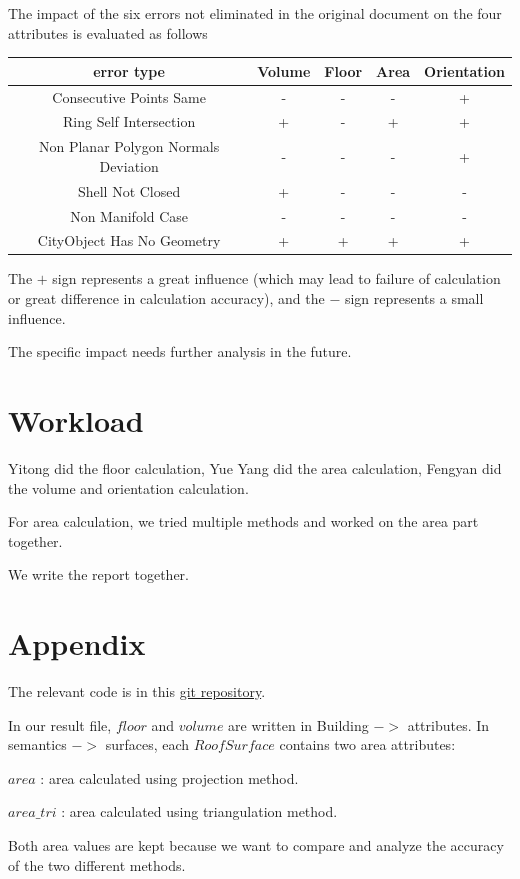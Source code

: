 \documentclass[12pt]{article}
\begin{document}
The impact of the six errors not eliminated in the original document on the four attributes is evaluated as follows

\begin{center}
\begin{tabular}{ |c|c|c|c|c| } 
 \hline
 error type & Volume & Floor & Area & Orientation \\ 
 \hline
 Consecutive Points Same & - & - & - & + \\ 
 \hline
 Ring Self Intersection & + & - & + & + \\ 
 \hline
 Non Planar Polygon Normals Deviation & - & - & - & + \\ 
 \hline
 Shell Not Closed & + & - & - & - \\ 
 \hline
 Non Manifold Case & - & - & - & - \\ 
 \hline
 CityObject Has No Geometry & + & + & + & + \\ 
 \hline
\end{tabular}
\end{center}

The $+$ sign represents a great influence (which may lead to failure of calculation or great difference in calculation accuracy), and the $-$ sign represents a small influence.

The specific impact needs further analysis in the future.
\section{Workload}

Yitong did the floor calculation, Yue Yang did the area calculation, Fengyan did the volume and orientation calculation.

For area calculation, we tried multiple methods and worked on the area part together.

We write the report together.

\section{Appendix}

The relevant code is in this
\href{https://github.com/SEUZFY/CityJSON}{git repository}.

In our result file, $floor$ and $volume$ are written in Building $->$ attributes. In semantics $->$ surfaces, each $RoofSurface$ contains two area attributes:

$area$ : area calculated using projection method.

$area\_tri$ : area calculated using triangulation method.

Both area values are kept because we want to compare and analyze the accuracy of the two different methods. 
\end{document}
